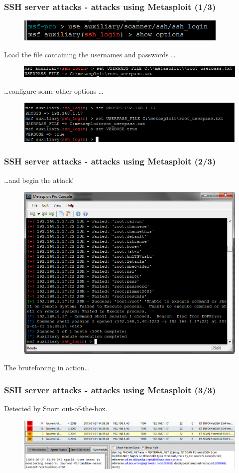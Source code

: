 \documentclass{beamer}
\begin{document}
\begin{frame}
\frametitle{SSH server attacks - attacks using Metasploit (1/3)}
\begin{figure}
   \includegraphics[width= 0.6\linewidth]{../images/VM_SSH_3.png}
\end{figure}
Load the file containing the usernames and passwords \ldots
\begin{figure}
   \includegraphics[width= 0.9\linewidth]{../images/VM_SSH_4.png}
\end{figure}
\ldots configure some other options \ldots
\begin{figure}
   \includegraphics[width= 0.9\linewidth]{../images/VM_SSH_2.png}
\end{figure}
\end{frame}
\begin{frame}
\frametitle{SSH server attacks - attacks using Metasploit (2/3)}
\ldots and begin the attack!
\begin{figure}
   \includegraphics[width= 0.7\linewidth]{../images/VM_SSH_5.png}
\end{figure}
The bruteforcing in action\ldots
\end{frame}
\begin{frame}
\frametitle{SSH server attacks - attacks using Metasploit (3/3)}
Detected by Snort out-of-the-box.
\begin{figure}
   \includegraphics[width= 1\linewidth]{../images/VM_SSH_6.png}
\end{figure}
\end{frame}
\end{document}
